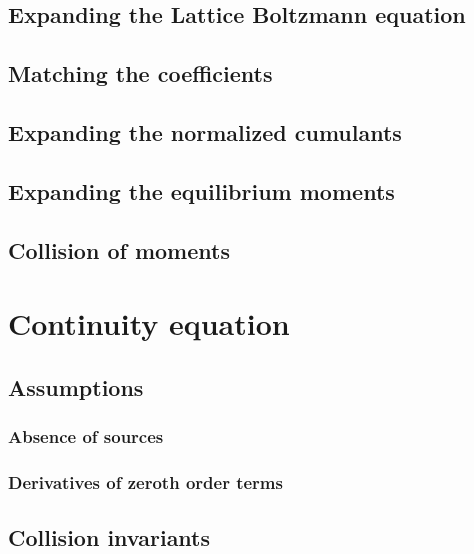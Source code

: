 \documentclass[12pt,a4paper,twoside]{article}
\begin{document}
\subsection{Expanding the Lattice Boltzmann equation}
\label{sub:Expanding the Lattice Boltzmann equation}

\subsection{Matching the coefficients}
\label{sub:Matching the coefficients}

\subsection{Expanding the normalized cumulants}
\label{sub:Expanding the normalized cumulants}

\subsection{Expanding the equilibrium moments}
\label{sub:Expanding the equilibrium moments}

\subsection{Collision of moments}
\label{sub:Collision of moments}

\section{Continuity equation}
\label{sec:Continuity equation}

\subsection{Assumptions}
\label{sub:Assumptions}

\subsubsection{Absence of sources}
\label{subs:Absence of sources}

\subsubsection{Derivatives of zeroth order terms}
\label{subs:Derivatives of zeroth order terms}

\subsection{Collision invariants}
\label{sub:Collision invariants}
\end{document}
